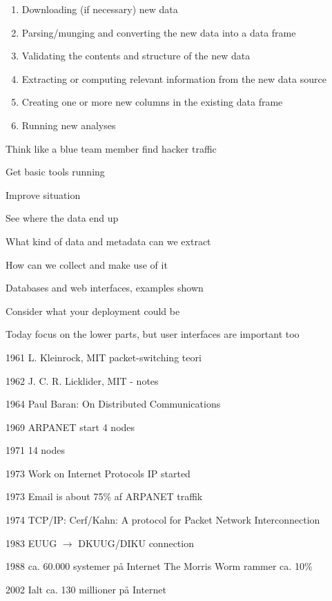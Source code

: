 \documentclass[Screen16to9,17pt]{foils}
\begin{document}
{\small
\begin{enumerate}
\item Downloading (if necessary) new data
\item  Parsing/munging and converting the new data into a data frame
\item  Validating the contents and structure of the new data
\item  Extracting or computing relevant information from the new data source
\item  Creating one or more new columns in the existing data frame
\item  Running new analyses
\end{enumerate}
}


\begin{list1}
\item Think like a blue team member find hacker traffic
\item Get basic tools running
\item Improve situation
\begin{list2}
\item See where the data end up
\item What kind of data and metadata can we extract
\item How can we collect and make use of it
\item Databases and web interfaces, examples shown
\item Consider what your deployment could be
\end{list2}
\end{list1}

\centerline{Today focus on the lower parts, but user interfaces are important too}


\begin{list2}
\item[1961]  L. Kleinrock, MIT packet-switching teori
\item[1962]  J. C. R. Licklider, MIT - notes
\item[1964]  Paul Baran: On Distributed Communications
\item[1969]  ARPANET start 4 nodes
\item[1971]  14 nodes
\item[1973]  Work on Internet Protocols IP started
\item[1973]  Email is about 75\% af ARPANET traffik
\item[1974]  TCP/IP: Cerf/Kahn: A protocol for Packet
        Network Interconnection
\item[1983]  EUUG $\rightarrow$ DKUUG/DIKU connection
\item[1988]  ca. 60.000 systemer på Internet
        The Morris Worm rammer ca. 10\%
\item[2002]  Ialt ca. 130 millioner på Internet
\end{list2}
\end{document}

